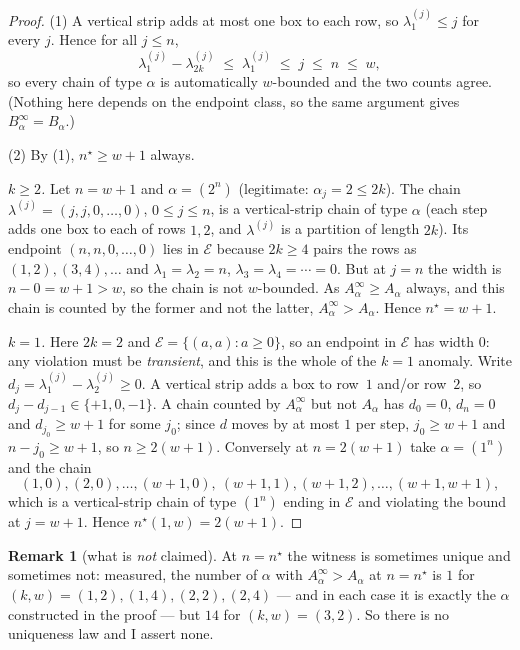 \documentclass[11pt]{article}
\theoremstyle{plain}
\theoremstyle{definition}
\newtheorem{remark}[theorem]{Remark}
\begin{document}
\begin{proof}
(1)  A vertical strip adds at most one box to each row, so
$\lambda^{(j)}_1\le j$ for every $j$.  Hence for all $j\le n$,
\[
  \lambda^{(j)}_1-\lambda^{(j)}_{2k}\;\le\;\lambda^{(j)}_1\;\le\;j\;\le\;n\;\le\;w,
\]
so every chain of type $\alpha$ is automatically $w$-bounded and the two counts agree.
(Nothing here depends on the endpoint class, so the same argument gives
$B^\infty_\alpha=B_\alpha$.)

(2)  By (1), $n^\star\ge w+1$ always.

\emph{$k\ge2$.}  Let $n=w+1$ and $\alpha=(2^n)$ (legitimate: $\alpha_j=2\le 2k$).  The chain
$\lambda^{(j)}=(j,j,0,\dots,0)$, $0\le j\le n$, is a vertical-strip chain of type $\alpha$
(each step adds one box to each of rows $1,2$, and $\lambda^{(j)}$ is a partition of length
$2k$).  Its endpoint $(n,n,0,\dots,0)$ lies in $\mathcal E$ because $2k\ge4$ pairs the rows
as $(1,2),(3,4),\dots$ and $\lambda_1=\lambda_2=n$, $\lambda_3=\lambda_4=\cdots=0$.  But at
$j=n$ the width is $n-0=w+1>w$, so the chain is not $w$-bounded.  As
$A^\infty_\alpha\ge A_\alpha$ always, and this chain is counted by the former and not the
latter, $A^\infty_\alpha>A_\alpha$.  Hence $n^\star=w+1$.

\emph{$k=1$.}  Here $2k=2$ and $\mathcal E=\{(a,a):a\ge0\}$, so an endpoint in $\mathcal E$
has width $0$: any violation must be \emph{transient}, and this is the whole of the $k=1$
anomaly.  Write $d_j=\lambda^{(j)}_1-\lambda^{(j)}_2\ge0$.  A vertical strip adds a box to
row~$1$ and/or row~$2$, so $d_{j}-d_{j-1}\in\{+1,0,-1\}$.  A chain counted by
$A^\infty_\alpha$ but not $A_\alpha$ has $d_0=0$, $d_n=0$ and $d_{j_0}\ge w+1$ for some
$j_0$; since $d$ moves by at most $1$ per step, $j_0\ge w+1$ and $n-j_0\ge w+1$, so
$n\ge 2(w+1)$.  Conversely at $n=2(w+1)$ take $\alpha=(1^n)$ and the chain
\[
  (1,0),(2,0),\dots,(w+1,0),\ (w+1,1),(w+1,2),\dots,(w+1,w+1),
\]
which is a vertical-strip chain of type $(1^n)$ ending in $\mathcal E$ and violating the
bound at $j=w+1$.  Hence $n^\star(1,w)=2(w+1)$.
\end{proof}

\begin{remark}[what is \emph{not} claimed]
At $n=n^\star$ the witness is sometimes unique and sometimes not: measured, the number of
$\alpha$ with $A^\infty_\alpha>A_\alpha$ at $n=n^\star$ is $1$ for
$(k,w)=(1,2),(1,4),(2,2),(2,4)$ --- and in each case it is exactly the $\alpha$ constructed
in the proof --- but $14$ for $(k,w)=(3,2)$.  So there is no uniqueness law and I assert
none.
\end{remark}
\end{document}
